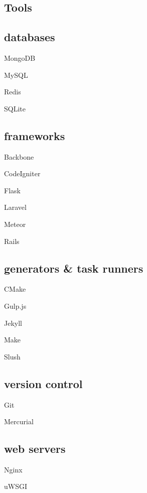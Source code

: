 \documentclass{article}
\newenvironment{aside}{%
\noindent
\begin{minipage}[t]{\dimexpr0.25\textwidth}%
\begin{flushright}%
\let\oldsection\section
\let\oldsubsection\subsection
\renewcommand{\section}[1]{\oldsection*{##1}}
\renewcommand{\subsection}[1]{\oldsubsection*{\small ##1}\vspace{-0.5em}}
}{%
\let\subsection\oldsubsection
\let\section\oldsection
\end{flushright}%
\end{minipage}%
}
\begin{document}
\begin{aside}
\raggedleft


\section{Tools}
\center
\subsection{databases}
\begin{itemize*}
\item{MongoDB}
\item{MySQL}
\item{Redis}
\item{SQLite}
\end{itemize*}

\subsection{frameworks}
\begin{itemize*}
\item{Backbone}
\item{CodeIgniter}
\item{Flask}
\item{Laravel}
\item{Meteor}
\item{Rails}
\end{itemize*}

\subsection{generators \& task runners}
\begin{itemize*}
\item{CMake}
\item{Gulp.js}
\item{Jekyll}
\item{Make}
\item{Slush}
\end{itemize*}

\subsection{version control}
\begin{itemize*}
\item{Git}
\item{Mercurial}
\end{itemize*}

\subsection{web servers}
\begin{itemize*}
\item{Nginx}
\item{uWSGI}
\end{itemize*}


\end{aside}
\end{document}
